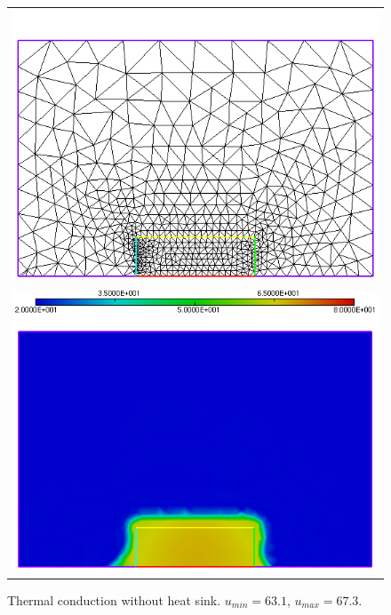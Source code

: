 \begin{figure}[h!]
	\centering
	\begin{tabular}{c}
		\includegraphics[width=.8\linewidth]{figures/nosinkc} \\ \includegraphics[width=.8\linewidth]{figures/nosinkb}
	\end{tabular}
	\caption{Thermal conduction without heat sink. $u_{min}=63.1$, $u_{max}=67.3$.}
	\label{fig:nosink}
\end{figure}
